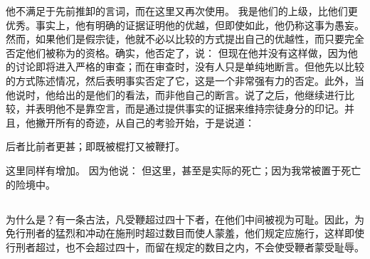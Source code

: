 \par

他不满足于先前推卸的言词，而在这里又再次使用。 我是他们的上级，比他们更优秀。事实上，他有明确的证据证明他的优越，但即使如此，他仍称这事为愚妄。然而，如果他们是假宗徒，他就不必以比较的方式提出自己的优越性，而只要完全否定他们被称为的资格。确实，他否定了，说： 但现在他并没有这样做，因为他的讨论即将进入严格的审查；而在审查时，没有人只是单纯地断言。但他先以比较的方式陈述情况，然后表明事实否定了它，这是一个非常强有力的否定。此外，当他说时，他给出的是他们的看法，而非他自己的断言。说了之后，他继续进行比较，并表明他不是靠空言，而是通过提供事实的证据来维持宗徒身分的印记。并且，他撇开所有的奇迹，从自己的考验开始，于是说道：\par

 后者比前者更甚；即既被棍打又被鞭打。\par

 这里同样有增加。 因为他说： 但这里，甚至是实际的死亡；因为我常被置于死亡的险境中。\par


\subsection{}

\par

为什么是？有一条古法，凡受鞭超过四十下者，在他们中间被视为可耻。因此，为免行刑者的猛烈和冲动在施刑时超过数目而使人蒙羞，他们规定应施行，这样即使行刑者超过，也不会超过四十，而留在规定的数目之内，不会使受鞭者蒙受耻辱。\par


\subsection{}

